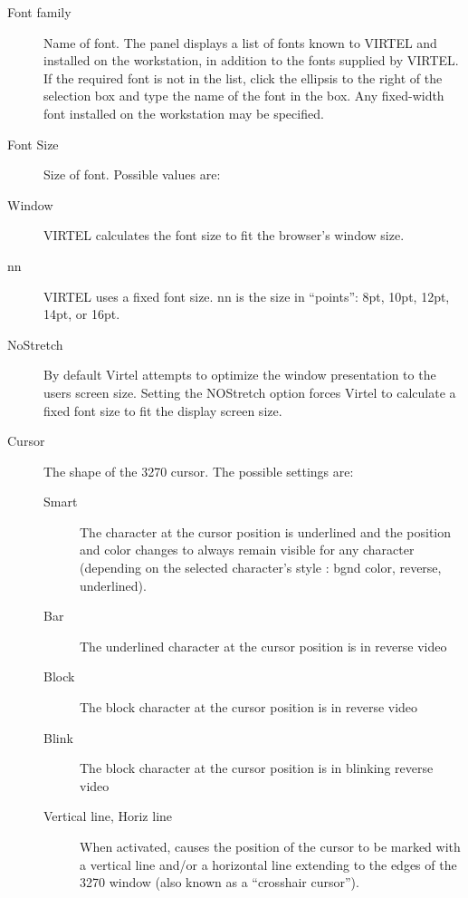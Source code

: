\documentclass[letterpaper,10pt,english]{sphinxmanual}
\begin{document}
\begin{description}
\item[{Font family}] \leavevmode
Name of font. The panel displays a list of fonts known to VIRTEL and installed on the workstation, in addition to the fonts supplied by VIRTEL. If the required font is not in the list, click the ellipsis to the right of the selection box and type the name of the font in the box. Any fixed-width font installed on the workstation may be specified.

\item[{Font Size}] \leavevmode
Size of font. Possible values are:

\item[{Window}] \leavevmode
VIRTEL calculates the font size to fit the browser’s window size.

\item[{nn}] \leavevmode
VIRTEL uses a fixed font size. nn is the size in “points”: 8pt, 10pt, 12pt, 14pt, or 16pt.

\item[{NoStretch}] \leavevmode
By default Virtel attempts to optimize the window presentation to the users screen size. Setting the NOStretch option forces Virtel to calculate a fixed font size to fit the display screen size.

\item[{Cursor}] \leavevmode
The shape of the 3270 cursor. The possible settings are:
\begin{description}
\item[{Smart}] \leavevmode
The character at the cursor position is underlined and the position and color changes to always remain visible for any character (depending on the selected character’s style : bgnd color, reverse, underlined).

\item[{Bar}] \leavevmode
The underlined character at the cursor position is in reverse video

\item[{Block}] \leavevmode
The block character at the cursor position is in reverse video

\item[{Blink}] \leavevmode
The block character at the cursor position is in blinking reverse video

\item[{Vertical line, Horiz line}] \leavevmode
When activated, causes the position of the cursor to be marked with a vertical line and/or a horizontal line extending to the edges of the 3270 window (also known as a “crosshair cursor”).


\end{description}
\end{description}
\end{document}
